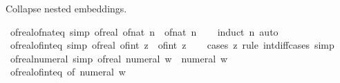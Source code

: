 \begin{isabellebody}
\endisatagproof
{\isafoldproof}%
%
\isadelimproof
%
\endisadelimproof
%
\begin{isamarkuptext}%
Collapse nested embeddings.%
\end{isamarkuptext}\isamarkuptrue%
\isamarkupfalse%
\ of{\isacharunderscore}{\kern0pt}real{\isacharunderscore}{\kern0pt}of{\isacharunderscore}{\kern0pt}nat{\isacharunderscore}{\kern0pt}eq\ {\isacharbrackleft}{\kern0pt}simp{\isacharbrackright}{\kern0pt}{\isacharcolon}{\kern0pt}\ {\isachardoublequoteopen}of{\isacharunderscore}{\kern0pt}real\ {\isacharparenleft}{\kern0pt}of{\isacharunderscore}{\kern0pt}nat\ n{\isacharparenright}{\kern0pt}\ {\isacharequal}{\kern0pt}\ of{\isacharunderscore}{\kern0pt}nat\ n{\isachardoublequoteclose}\isanewline
%
\isadelimproof
\ \ %
\endisadelimproof
%
\isatagproof
{}\isamarkupfalse%
\ {\isacharparenleft}{\kern0pt}induct\ n{\isacharparenright}{\kern0pt}\ auto%
\endisatagproof
{\isafoldproof}%
%
\isadelimproof
\isanewline
%
\endisadelimproof
\isanewline
{}\isamarkupfalse%
\ of{\isacharunderscore}{\kern0pt}real{\isacharunderscore}{\kern0pt}of{\isacharunderscore}{\kern0pt}int{\isacharunderscore}{\kern0pt}eq\ {\isacharbrackleft}{\kern0pt}simp{\isacharbrackright}{\kern0pt}{\isacharcolon}{\kern0pt}\ {\isachardoublequoteopen}of{\isacharunderscore}{\kern0pt}real\ {\isacharparenleft}{\kern0pt}of{\isacharunderscore}{\kern0pt}int\ z{\isacharparenright}{\kern0pt}\ {\isacharequal}{\kern0pt}\ of{\isacharunderscore}{\kern0pt}int\ z{\isachardoublequoteclose}\isanewline
%
\isadelimproof
\ \ %
\endisadelimproof
%
\isatagproof
{}\isamarkupfalse%
\ {\isacharparenleft}{\kern0pt}cases\ z\ rule{\isacharcolon}{\kern0pt}\ int{\isacharunderscore}{\kern0pt}diff{\isacharunderscore}{\kern0pt}cases{\isacharparenright}{\kern0pt}\ simp%
\endisatagproof
{\isafoldproof}%
%
\isadelimproof
\isanewline
%
\endisadelimproof
\isanewline
{}\isamarkupfalse%
\ of{\isacharunderscore}{\kern0pt}real{\isacharunderscore}{\kern0pt}numeral\ {\isacharbrackleft}{\kern0pt}simp{\isacharbrackright}{\kern0pt}{\isacharcolon}{\kern0pt}\ {\isachardoublequoteopen}of{\isacharunderscore}{\kern0pt}real\ {\isacharparenleft}{\kern0pt}numeral\ w{\isacharparenright}{\kern0pt}\ {\isacharequal}{\kern0pt}\ numeral\ w{\isachardoublequoteclose}\isanewline
%
\isadelimproof
\ \ %
\endisadelimproof
%
\isatagproof
{}\isamarkupfalse%
\ of{\isacharunderscore}{\kern0pt}real{\isacharunderscore}{\kern0pt}of{\isacharunderscore}{\kern0pt}int{\isacharunderscore}{\kern0pt}eq\ {\isacharbrackleft}{\kern0pt}of\ {\isachardoublequoteopen}numeral\ w{\isachardoublequoteclose}{\isacharbrackright}{\kern0pt}\ \isamarkupfalse%

\end{isabellebody}
